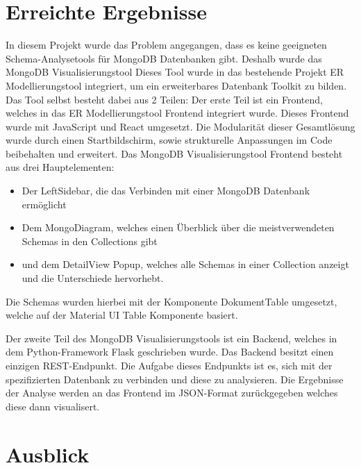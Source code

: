 \section{Erreichte Ergebnisse}
\label{sec:ergebnisse}

\iffalse
Die Zusammenfassung dient dazu, die wesentlichen Ergebnisse des 
Praktikums und vor allem die entwickelte Problemlösung und den 
erreichten Fortschritt darzustellen. (Sie haben Ihr Ziel erreicht und 
dies nachgewiesen).
\fi

In diesem Projekt wurde das Problem angegangen, dass es keine geeigneten Schema-Analysetools für MongoDB Datenbanken gibt.
Deshalb wurde das MongoDB Visualisierungstool
Dieses Tool wurde in das bestehende Projekt ER Modellierungstool integriert, um ein erweiterbares Datenbank Toolkit zu bilden.
Das Tool selbst besteht dabei aus 2 Teilen:
Der erste Teil ist ein Frontend, welches in das ER Modellierungstool Frontend integriert wurde.
Dieses Frontend wurde mit JavaScript und React umgesetzt.
Die Modularität dieser Gesamtlösung wurde durch einen Startbildschirm, sowie strukturelle Anpassungen im Code beibehalten und erweitert.
Das MongoDB Visualisierungstool Frontend besteht aus drei Hauptelementen:
\begin{itemize}
    \item Der LeftSidebar, die das Verbinden mit einer MongoDB Datenbank ermöglicht
    \item Dem MongoDiagram, welches einen Überblick über die meistverwendeten Schemas in den Collections gibt
    \item und dem DetailView Popup, welches alle Schemas in einer Collection anzeigt und die Unterschiede hervorhebt.
\end{itemize}

Die Schemas wurden hierbei mit der Komponente DokumentTable umgesetzt, welche auf der Material UI Table Komponente basiert.

Der zweite Teil des MongoDB Visualisierungstools ist ein Backend, welches in dem Python-Framework Flask geschrieben wurde.
Das Backend besitzt einen einzigen REST-Endpunkt.
Die Aufgabe dieses Endpunkts ist es, sich mit der spezifizierten Datenbank zu verbinden und diese zu analysieren.
Die Ergebnisse der Analyse werden an das Frontend im JSON-Format zurückgegeben welches diese dann visualisert.

\section{Ausblick}
\label{sec:ausblick}

